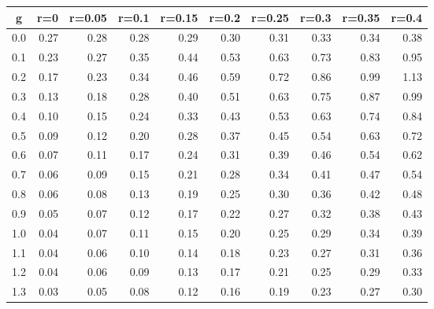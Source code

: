 %
\begin{table}[!tbp]
 \begin{center}
 \begin{tabular}{rrrrrrrrrr}\hline\hline
\multicolumn{1}{c}{g}&\multicolumn{1}{c}{r=0}&\multicolumn{1}{c}{r=0.05}&\multicolumn{1}{c}{r=0.1}&\multicolumn{1}{c}{r=0.15}&\multicolumn{1}{c}{r=0.2}&\multicolumn{1}{c}{r=0.25}&\multicolumn{1}{c}{r=0.3}&\multicolumn{1}{c}{r=0.35}&\multicolumn{1}{c}{r=0.4}\tabularnewline
\hline
0.0&0.27&0.28&0.28&0.29&0.30&0.31&0.33&0.34&0.38\tabularnewline
0.1&0.23&0.27&0.35&0.44&0.53&0.63&0.73&0.83&0.95\tabularnewline
0.2&0.17&0.23&0.34&0.46&0.59&0.72&0.86&0.99&1.13\tabularnewline
0.3&0.13&0.18&0.28&0.40&0.51&0.63&0.75&0.87&0.99\tabularnewline
0.4&0.10&0.15&0.24&0.33&0.43&0.53&0.63&0.74&0.84\tabularnewline
0.5&0.09&0.12&0.20&0.28&0.37&0.45&0.54&0.63&0.72\tabularnewline
0.6&0.07&0.11&0.17&0.24&0.31&0.39&0.46&0.54&0.62\tabularnewline
0.7&0.06&0.09&0.15&0.21&0.28&0.34&0.41&0.47&0.54\tabularnewline
0.8&0.06&0.08&0.13&0.19&0.25&0.30&0.36&0.42&0.48\tabularnewline
0.9&0.05&0.07&0.12&0.17&0.22&0.27&0.32&0.38&0.43\tabularnewline
1.0&0.04&0.07&0.11&0.15&0.20&0.25&0.29&0.34&0.39\tabularnewline
1.1&0.04&0.06&0.10&0.14&0.18&0.23&0.27&0.31&0.36\tabularnewline
1.2&0.04&0.06&0.09&0.13&0.17&0.21&0.25&0.29&0.33\tabularnewline
1.3&0.03&0.05&0.08&0.12&0.16&0.19&0.23&0.27&0.30\tabularnewline
\hline
\end{tabular}

\end{center}

\end{table}

